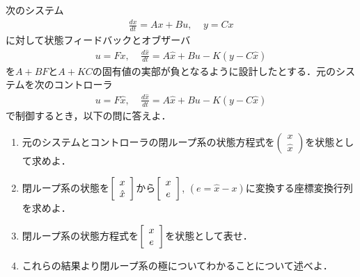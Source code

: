 \item 
次のシステム
\begin{align}
	\frac{dx}{dt}=Ax+Bu
	, \ \ \ \ \ 
	y= Cx
\nonumber
\end{align}
に対して状態フィードバックとオブザーバ
\begin{align}
	u = Fx, \ \ \ \ \ 
	\frac{d \hat{x}}{dt} = A \hat{x} + B u - K (y-C\hat{x})
\nonumber
\end{align}
を$A+BF$と$A+KC$の固有値の実部が負となるように設計したとする．元のシステムを次のコントローラ
\begin{align}
	u = F\hat{x}, \ \ \ \ \ 
	\frac{d \hat{x}}{dt} = A \hat{x} + B u - K (y-C\hat{x})
\nonumber
\end{align}
で制御するとき，以下の問に答えよ．
\vfill\null
\columnbreak


\begin{enumerate}
\item 
元のシステムとコントローラの閉ループ系の状態方程式を$\left( \begin{array}{c} x \\ \hat{x} \end{array} \right)$を状態として求めよ．
\vspace{7cm}

\item
閉ループ系の状態を$\bmatrix{c} x \\ \hat{x} \ematrix$から$\bmatrix{c} x \\ e \ematrix$, $ (e= \hat{x}- x) $に変換する座標変換行列を求めよ．
\vspace{3cm}

\item
閉ループ系の状態方程式を$\bmatrix{c} x \\ e \ematrix$を状態として表せ．
\vspace{10cm}

\item
これらの結果より閉ループ系の極についてわかることについて述べよ．
\end{enumerate}
